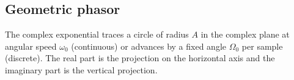 \documentclass{ee102_notes}
\begin{document}
\subsection*{Geometric phasor}
The complex exponential traces a circle of radius $A$ in the complex plane at angular speed $\omega_0$ (continuous) or advances by a fixed angle $\Omega_0$ per sample (discrete). The real part is the projection on the horizontal axis and the imaginary part is the vertical projection.
\end{document}
